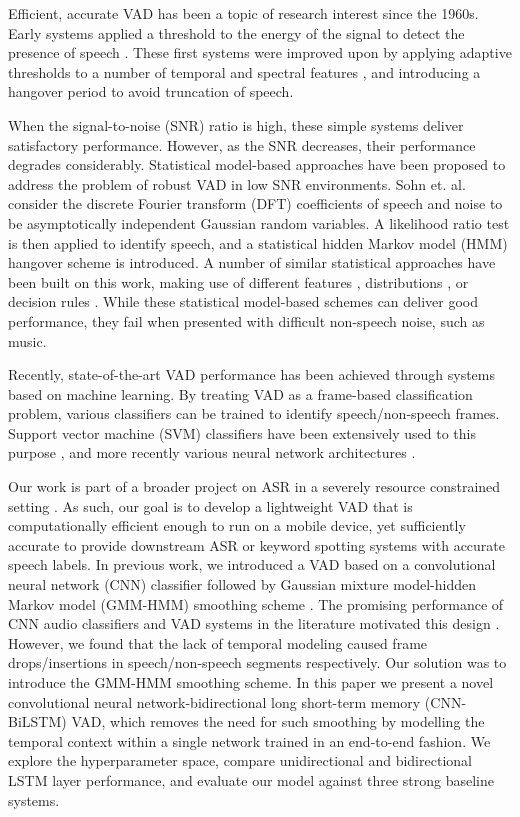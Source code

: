 \documentclass{article}
\begin{document}
Efficient, accurate VAD has been a topic of research interest since the 1960s.
Early systems applied a threshold to the energy of the signal to detect the presence of speech \cite{TASI}.
These first systems were improved upon by applying adaptive thresholds to a number of temporal and spectral features \cite{G.729, GSM06.32}, and introducing a hangover period to avoid truncation of speech.

When the signal-to-noise (SNR) ratio is high, these simple systems deliver satisfactory performance.
However, as the SNR decreases, their performance degrades considerably.
Statistical model-based approaches have been proposed to address the problem of robust VAD in low SNR environments.
Sohn et. al. \cite{Sohn} consider the discrete Fourier transform (DFT) coefficients of speech and noise to be asymptotically independent Gaussian random variables.
A likelihood ratio test is then applied to identify speech, and a statistical hidden Markov model (HMM) hangover scheme is introduced.
A number of similar statistical approaches have been built on this work, making use of different features \cite{KLTLaplaceGauss}, distributions \cite{Gamma, Multiple_models}, or decision rules \cite{MO_LRT}.
While these statistical model-based schemes can deliver good performance, they fail when presented with difficult non-speech noise, such as music.

Recently, state-of-the-art VAD performance has been achieved through systems based on machine learning.
By treating VAD as a frame-based classification problem, various classifiers can be trained to identify speech/non-speech frames.
Support vector machine (SVM) classifiers have been extensively used to this purpose \cite{SMV1, SVM2, SVM3, SVM4}, and more recently various neural network architectures \cite{DBN_VAD, DNN_VAD1, RNN_VAD, DNN_VAD2}.

Our work is part of a broader project on ASR in a severely resource constrained setting \cite{Biswas2019}.
As such, our goal is to develop a lightweight VAD that is computationally efficient enough to run on a mobile device, yet sufficiently accurate to provide downstream ASR or keyword spotting systems with accurate speech labels.
In previous work, we introduced a VAD based on a convolutional neural network (CNN) classifier followed by Gaussian mixture model-hidden Markov model (GMM-HMM) smoothing scheme \cite{wilkinson}.
The promising performance of CNN audio classifiers and VAD systems in the literature motivated this design \cite{BigCNN, SmallCNN}.
However, we found that the lack of temporal modeling caused frame drops/insertions in speech/non-speech segments respectively.
Our solution was to introduce the GMM-HMM smoothing scheme.
In this paper we present a novel convolutional neural network-bidirectional long short-term memory (CNN-BiLSTM) VAD, which removes the need for such smoothing by modelling the temporal context within a single network trained in an end-to-end fashion.
We explore the hyperparameter space, compare unidirectional and bidirectional LSTM layer performance, and evaluate our model against three strong baseline systems.
\end{document}
